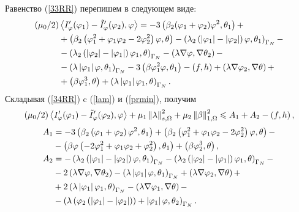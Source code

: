 Равенство (\ref{33RR}) перепишем в следующем виде:
\begin{equation}
    \label{34RR}
    \begin{split}
        (\mu_0 / 2) &\left\langle I_\varphi' (\varphi_1) - \tilde I_\varphi' (\varphi_2), \varphi \right\rangle =
        - 3 \left( \beta_2  (\varphi_1 + \varphi_2) \varphi^2, \theta_1 \right) + \\
        & + \left( \beta_2 
            \left( 
                \varphi_1^2 + \varphi_1 \varphi_2 - 2 \varphi_2^2
             \right) \varphi, \theta
         \right)
        - \left( \lambda_2 
            \left( 
                \left\vert \varphi_1 \right\vert - \left\vert \varphi_2 \right\vert
             \right) \varphi, \theta_1
         \right)_{\Gamma_N} - \\
        &- \left( \lambda_2 
            \left( 
                \left\vert \varphi_2 \right\vert - \left\vert \varphi_1 \right\vert
             \right) \varphi_1, \theta
         \right)_{\Gamma_N}
        - \left( \lambda \nabla \varphi, \nabla \theta_2 \right) - \\
        &- \left( \lambda \left\vert \varphi_1 \right\vert \varphi, \theta_1 \right)_{\Gamma_N}
        - 3 \left( \beta \varphi_1^2 \varphi, \theta_1 \right) 
        - \left( f, h \right) + \left( \lambda \nabla \varphi_2, \nabla \theta \right) + \\
        &+ \left( \beta \varphi_1^3, \theta \right) 
        + \left( \lambda \left\vert \varphi_1 \right\vert \varphi_1, \theta \right)_{\Gamma_N}.
    \end{split}
\end{equation}
Складывая (\ref{34RR}) c (\ref{lam}) и (\ref{prmin}), получим
\[
    (\mu_0 / 2) \left\langle I_\varphi' (\varphi_1) - \tilde I_\varphi' (\varphi_2), \varphi \right\rangle 
    + \mu_1 \left\Vert \lambda \right\Vert_{s,\Omega}^2 
    + \mu_2 \left\Vert \beta \right\Vert_{1,\Omega}^2 \leqslant A_1 + A_2 - \left( f, h \right),
\]
\begin{equation}
    \label{thetaminus3}
    \begin{split}
        A_1 &= - 3 \left( \beta_2 \left( \varphi_1 + \varphi_2 \right) \varphi^2, \theta_1 \right)
        + \left( \beta_2 
            \left( 
                \varphi_1^2 + \varphi_1 \varphi_2 - 2 \varphi_2^2
             \right) \varphi, \theta
         \right) - \\
        &- \left( \beta \varphi 
            \left(  
                -2 \varphi_1^2 + \varphi_1 \varphi_2 + \varphi_2^2
             \right), \theta_1
         \right) 
        + \left( \beta \varphi_2^3, \theta \right), \\
        A_2 &= - \left( \lambda_2 
            \left( 
                \left\vert \varphi_1 \right\vert - \left\vert \varphi_2 \right\vert
             \right) \varphi, \theta_1
         \right)_{\Gamma_N} 
        - \left( \lambda_2 
            \left( 
                \left\vert \varphi_2 \right\vert - \left\vert \varphi_1 \right\vert
             \right) \varphi_1, \theta
         \right)_{\Gamma_N} - \\
        &- 2 \left( \lambda \nabla \varphi, \nabla \theta_2 \right)
        - \left( \lambda \left\vert \varphi_1 \right\vert \varphi, \theta_1 \right)_{\Gamma_N} 
        + \left( \lambda \nabla \varphi_2, \nabla \theta \right) + \\
        &+ 2 \left( \lambda \left\vert \varphi_1 \right\vert \varphi_1, \theta \right)_{\Gamma_N}
        - \left( \lambda \nabla \varphi_1, \nabla \theta \right) - \\
        &- \left( \lambda 
            \left( 
                \varphi_2 \left( 
                    \left\vert \varphi_1 \right\vert - \left\vert \varphi_2 \right\vert
                 \right)
             \right) + \left\vert \varphi_1 \right\vert \varphi, \theta_2
         \right)_{\Gamma_N}.
    \end{split}
\end{equation}

